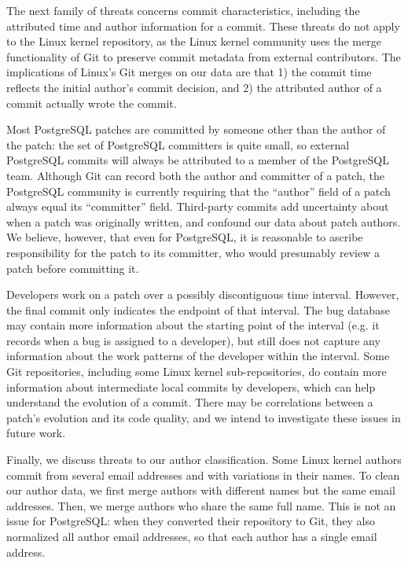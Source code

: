 The next family of threats concerns commit characteristics, including the
attributed time and author information for a commit. These threats do not apply
to the Linux kernel repository, as the Linux kernel community uses the merge
functionality of Git to preserve commit metadata from external
contributors. The implications of Linux's Git merges
on our data are that 1) the commit time reflects the initial author's commit
decision, and 2) the attributed author of a commit actually wrote the commit.

Most PostgreSQL patches are committed by someone other than the author of the
patch: the set of PostgreSQL committers is quite small, so external PostgreSQL
commits will always be attributed to a member of the PostgreSQL team. Although
Git can record both the author and committer of a patch, the PostgreSQL
community is currently requiring that the ``author'' field of a patch always
equal its ``committer'' field. Third-party commits add uncertainty about
when a patch was originally written, and confound our data about patch authors.
We believe, however, that even for PostgreSQL, it is reasonable to ascribe
responsibility for the patch to its committer, who would presumably review a
patch before committing it.

Developers work on a patch over a possibly discontiguous time interval. However,
the final commit only indicates the endpoint of that interval. The bug database
may contain more information about the starting point of the interval (e.g. it
records when a bug is assigned to a developer), but still does not capture any
information about the work patterns of the developer within the interval. Some
Git repositories, including some Linux kernel sub-repositories, do contain more
information about intermediate local commits by developers, which can help
understand the evolution of a commit. There may be correlations between a
patch's evolution and its code quality, and we intend to investigate these issues in
future work.

Finally, we discuss threats to our author classification. Some Linux
kernel authors commit from several email addresses and with variations
in their names. To clean our author data, we first merge authors with
different names but the same email addresses. Then, we merge authors
who share the same full name. This is not an issue for PostgreSQL:
when they converted their repository to Git, they also normalized all
author email addresses, so that each author has a single email
address.

